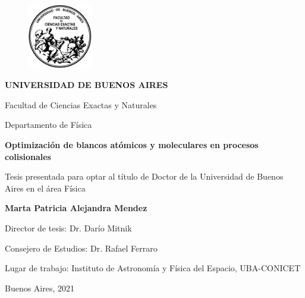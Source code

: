 \begin{titlepage}
\begin{center}

\begin{figure}[htb]
\centering
\includegraphics[width=0.25\textwidth]{figures/logofcenuba.png}
\end{figure}

\vspace{0.2cm}
\textbf{UNIVERSIDAD DE BUENOS AIRES}

\vspace{0.2cm}
Facultad de Ciencias Exactas y Naturales

\vspace{0.2cm}
Departamento de Física

\vspace{1.75cm}
\begin{Large}
\textbf{Optimización de blancos atómicos y moleculares en 
procesos colisionales} \\
\end{Large}

\vspace{1cm}
Tesis presentada para optar al título de Doctor de la Universidad de 
Buenos Aires en el área Física

\vspace{1.5cm}
\textbf{Marta Patricia Alejandra Mendez}\\
\end{center}

\vspace{1.25cm}
\noindent
Director de tesis: Dr. Darío Mitnik

\vspace{0.2cm}
\noindent
Consejero de Estudios: Dr. Rafael Ferraro

\vspace{0.75cm}
\noindent
Lugar de trabajo: Instituto de Astronomía y Física del Espacio, UBA-CONICET

\vspace{1.5cm}
\noindent
Buenos Aires, 2021

\end{titlepage}
\restoregeometry
